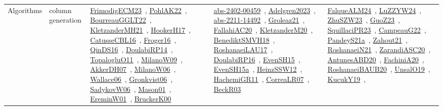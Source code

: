 {\begin{longtable}{lp{3cm}>{\raggedright\arraybackslash}p{6cm}>{\raggedright\arraybackslash}p{6cm}>{\raggedright\arraybackslash}p{8cm}}
\index{column generation}\index{Algorithms!column generation}Algorithms & column generation & \href{../works/FrimodigECM23.pdf}{FrimodigECM23}~\cite{FrimodigECM23}, \href{../works/PohlAK22.pdf}{PohlAK22}~\cite{PohlAK22}, \href{../works/BourreauGGLT22.pdf}{BourreauGGLT22}~\cite{BourreauGGLT22}, \href{../works/KletzanderMH21.pdf}{KletzanderMH21}~\cite{KletzanderMH21}, \href{../works/HookerH17.pdf}{HookerH17}~\cite{HookerH17}, \href{../works/CatusseCBL16.pdf}{CatusseCBL16}~\cite{CatusseCBL16}, \href{../works/Froger16.pdf}{Froger16}~\cite{Froger16}, \href{../works/QinDS16.pdf}{QinDS16}~\cite{QinDS16}, \href{../works/DoulabiRP14.pdf}{DoulabiRP14}~\cite{DoulabiRP14}, \href{../works/TopalogluO11.pdf}{TopalogluO11}~\cite{TopalogluO11}, \href{../works/MilanoW09.pdf}{MilanoW09}~\cite{MilanoW09}, \href{../works/AkkerDH07.pdf}{AkkerDH07}~\cite{AkkerDH07}, \href{../works/MilanoW06.pdf}{MilanoW06}~\cite{MilanoW06}, \href{../works/Wallace06.pdf}{Wallace06}~\cite{Wallace06}, \href{../works/Gronkvist06.pdf}{Gronkvist06}~\cite{Gronkvist06}, \href{../works/SadykovW06.pdf}{SadykovW06}~\cite{SadykovW06}, \href{../works/Mason01.pdf}{Mason01}~\cite{Mason01}, \href{../works/EreminW01.pdf}{EreminW01}~\cite{EreminW01}, \href{../works/BruckerK00.pdf}{BruckerK00}~\cite{BruckerK00} & \href{../works/abs-2402-00459.pdf}{abs-2402-00459}~\cite{abs-2402-00459}, \href{../works/Adelgren2023.pdf}{Adelgren2023}~\cite{Adelgren2023}, \href{../works/abs-2211-14492.pdf}{abs-2211-14492}~\cite{abs-2211-14492}, \href{../works/Groleaz21.pdf}{Groleaz21}~\cite{Groleaz21}, \href{../works/FallahiAC20.pdf}{FallahiAC20}~\cite{FallahiAC20}, \href{../works/KletzanderM20.pdf}{KletzanderM20}~\cite{KletzanderM20}, \href{../works/BenediktSMVH18.pdf}{BenediktSMVH18}~\cite{BenediktSMVH18}, \href{../works/RoshanaeiLAU17.pdf}{RoshanaeiLAU17}~\cite{RoshanaeiLAU17}, \href{../works/DoulabiRP16.pdf}{DoulabiRP16}~\cite{DoulabiRP16}, \href{../works/EvenSH15.pdf}{EvenSH15}~\cite{EvenSH15}, \href{../works/EvenSH15a.pdf}{EvenSH15a}~\cite{EvenSH15a}, \href{../works/HeinzSSW12.pdf}{HeinzSSW12}~\cite{HeinzSSW12}, \href{../works/HachemiGR11.pdf}{HachemiGR11}~\cite{HachemiGR11}, \href{../works/CorreaLR07.pdf}{CorreaLR07}~\cite{CorreaLR07}, \href{../works/BeckR03.pdf}{BeckR03}~\cite{BeckR03} & \href{../works/FalqueALM24.pdf}{FalqueALM24}~\cite{FalqueALM24}, \href{../works/LuZZYW24.pdf}{LuZZYW24}~\cite{LuZZYW24}, \href{../works/ZhuSZW23.pdf}{ZhuSZW23}~\cite{ZhuSZW23}, \href{../works/GuoZ23.pdf}{GuoZ23}~\cite{GuoZ23}, \href{../works/SquillaciPR23.pdf}{SquillaciPR23}~\cite{SquillaciPR23}, \href{../works/CampeauG22.pdf}{CampeauG22}~\cite{CampeauG22}, \href{../works/PandeyS21a.pdf}{PandeyS21a}~\cite{PandeyS21a}, \href{../works/Zahout21.pdf}{Zahout21}~\cite{Zahout21}, \href{../works/RoshanaeiN21.pdf}{RoshanaeiN21}~\cite{RoshanaeiN21}, \href{../works/ZarandiASC20.pdf}{ZarandiASC20}~\cite{ZarandiASC20}, \href{../works/AntunesABD20.pdf}{AntunesABD20}~\cite{AntunesABD20}, \href{../works/FachiniA20.pdf}{FachiniA20}~\cite{FachiniA20}, \href{../works/RoshanaeiBAUB20.pdf}{RoshanaeiBAUB20}~\cite{RoshanaeiBAUB20}, \href{../works/UnsalO19.pdf}{UnsalO19}~\cite{UnsalO19}, \href{../works/KucukY19.pdf}{KucukY19}~\cite{KucukY19}, 
\end{longtable}}
